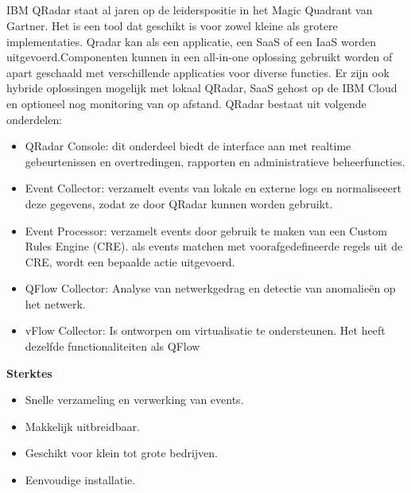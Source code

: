 \subsection{}

IBM QRadar staat al jaren op de leiderspositie in het Magic Quadrant van Gartner. Het is een tool dat geschikt is voor 
zowel kleine als grotere implementaties. Qradar kan als een applicatie, een SaaS of een IaaS worden uitgevoerd.Componenten kunnen in een all-in-one oplossing gebruikt worden of apart geschaald met verschillende applicaties voor diverse functies. Er zijn ook hybride oplossingen mogelijk met lokaal QRadar,
SaaS gehost op de IBM Cloud en optioneel nog monitoring van op afstand.
QRadar bestaat uit volgende onderdelen:

\begin{itemize}
    \item QRadar Console: dit onderdeel biedt de interface aan met realtime gebeurtenissen en overtredingen, rapporten en administratieve beheerfuncties.
    
    \item Event Collector: verzamelt events van lokale en externe logs en normaliseeert deze gegevens, zodat ze door QRadar kunnen worden gebruikt.
    
    \item Event Processor: verzamelt events door gebruik te maken van een Custom Rules Engine (CRE). als events matchen met voorafgedefineerde regels uit de CRE, wordt een bepaalde actie uitgevoerd.
    
    \item QFlow Collector: Analyse van netwerkgedrag en detectie van anomalieën op het netwerk.
    
    \item vFlow Collector: Is ontworpen om virtualisatie te ondersteunen. Het heeft dezelfde functionaliteiten als QFlow
    
\end{itemize}

\textbf{Sterktes}

\begin{itemize}
    \item Snelle verzameling en verwerking van events.
    \item Makkelijk uitbreidbaar.
    \item Geschikt voor klein tot grote bedrijven.
    \item Eenvoudige installatie.
    
\end{itemize}

